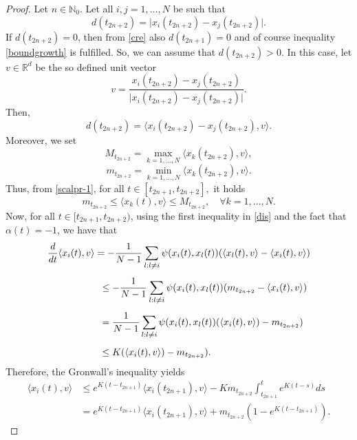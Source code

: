 \documentclass[a4paper,11pt,oneside]{article}
\begin{document}
\begin{proof}
	Let $n\in \mathbb{N}_{0}$. Let all $i,j=1,\dots,N$ be such that $$d(t_{2n+2})=\lvert x_{i}(t_{2n+2})-x_{j}(t_{2n+2})\rvert.$$
	If $d(t_{2n+2})=0$, then from \eqref{cre} also $d(t_{2n+1})=0$ and of course inequality \eqref{boundgrowth} is fulfilled. So, we can assume that $d(t_{2n+2})>0$. In this case, let $v\in \mathbb{R}^{d}$ be the so defined unit vector
	$$v=\frac{x_{i}(t_{2n+2})-x_{j}(t_{2n+2})}{\lvert x_{i}(t_{2n+2})-x_{j}(t_{2n+2})\rvert}.$$
	Then, $$d(t_{2n+2})=\langle x_{i}(t_{2n+2})-x_{j}(t_{2n+2}),v\rangle .$$
	Moreover, we set
	$$M_{t_{2n+2}}=\max_{k=1,\dots,N}\langle x_{k}(t_{2n+2}),v\rangle,$$
	$$m_{t_{2n+2}}=\min_{k=1,\dots,N}\langle x_{k}(t_{2n+2}),v\rangle.$$
	Thus, from \eqref{scalpr-1}, for all $t\in [t_{2n+1},t_{2n+2}],$ it holds
	\begin{equation}\label{dis}
		m_{t_{2n+2}}\leq\langle x_{k}(t),v\rangle\leq M_{t_{2n+2}},\quad \forall k=1,\dots,N.
	\end{equation}
Now, for all $t\in [t_{2n+1},t_{2n+2})$, using the first inequality in \eqref{dis} and the fact that $\alpha(t)=-1$, we have that
	$$\begin{array}{l}
		\vspace{0.3cm}\displaystyle{\frac{d}{dt}\langle x_{i}(t),v\rangle=-\frac{1}{N-1}\sum_{l:l\neq i}\psi(x_{i}(t),x_{l}(t))(\langle x_{l}(t),v\rangle-\langle x_{i}(t),v\rangle)}\\
		\vspace{0.3cm}\displaystyle{\hspace{2cm}\leq -\frac{1}{N-1}\sum_{l:l\neq i}\psi(x_{i}(t),x_{l}(t))(m_{t_{2n+2}}-\langle x_{i}(t),v\rangle)}\\
		\vspace{0.3cm}\displaystyle{\hspace{2cm}=\frac{1}{N-1}\sum_{l:l\neq i}\psi(x_{i}(t),x_{l}(t))(\langle x_{i}(t),v\rangle)-m_{t_{2n+2}})}\\
		\displaystyle{\hspace{2cm}\leq K(\langle x_{i}(t),v\rangle)-m_{t_{2n+2}}).}
	\end{array}$$
	Therefore, the Gronwall's inequality yields \begin{equation}\label{1}
		\begin{split}
			\langle x_{i}(t),v\rangle&\leq e^{K(t-t_{2n+1})}\langle x_{i}(t_{2n+1}),v\rangle-Km_{t_{2n+2}}\int_{t_{2n+1}}^{t}e^{K(t-s)}ds\\&=e^{K(t-t_{2n+1})}\langle x_{i}(t_{2n+1}),v\rangle+m_{t_{2n+2}}(1-e^{K(t-t_{2n+1})}).
		\end{split}

\end{equation}
\end{proof}
\end{document}
